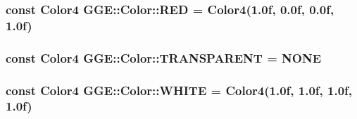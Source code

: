 \hypertarget{namespace_g_g_e_1_1_color_a98e8bfcace99241c67bc5d1921c459da}{
\subsubsection[{R\+E\+D}]{\setlength{\rightskip}{0pt plus 5cm}const {\bf Color4} G\+G\+E\+::\+Color\+::\+R\+E\+D = {\bf Color4}(1.\+0f, 0.\+0f, 0.\+0f, 1.\+0f)\hspace{0.3cm}{\ttfamily [static]}}}\label{namespace_g_g_e_1_1_color_a98e8bfcace99241c67bc5d1921c459da}
\hypertarget{namespace_g_g_e_1_1_color_a20973cadec5f187b10c2789739cd6833}{
\subsubsection[{T\+R\+A\+N\+S\+P\+A\+R\+E\+N\+T}]{\setlength{\rightskip}{0pt plus 5cm}const {\bf Color4} G\+G\+E\+::\+Color\+::\+T\+R\+A\+N\+S\+P\+A\+R\+E\+N\+T = {\bf N\+O\+N\+E}\hspace{0.3cm}{\ttfamily [static]}}}\label{namespace_g_g_e_1_1_color_a20973cadec5f187b10c2789739cd6833}
\hypertarget{namespace_g_g_e_1_1_color_a431b29401359e9cb0ecade51b388b2c8}{
\subsubsection[{W\+H\+I\+T\+E}]{\setlength{\rightskip}{0pt plus 5cm}const {\bf Color4} G\+G\+E\+::\+Color\+::\+W\+H\+I\+T\+E = {\bf Color4}(1.\+0f, 1.\+0f, 1.\+0f, 1.\+0f)\hspace{0.3cm}{\ttfamily [static]}}}\label{namespace_g_g_e_1_1_color_a431b29401359e9cb0ecade51b388b2c8}
